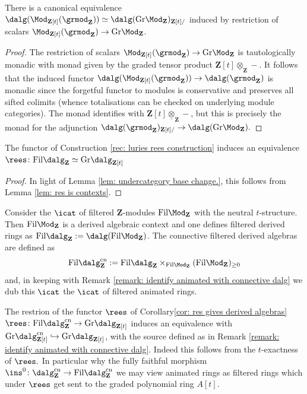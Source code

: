 \documentclass[10pt,reqno]{amsart}
\numberwithin{equation}{section}
\newcommand{\ZZ}{\mathbf{Z}}
\newcommand{\Gr}{\mathrm{Gr}}
\newcommand{\fil}{\mathrm{Fil}}
\newcommand{\into}{\hookrightarrow}
\newcommand{\cn}{\mathrm{cn}}
\begin{document}
    
\begin{lemma}\label{lem: undercategory base change.} 
    There is a canonical equivalence $\dalg(\Mod_{\ZZ[t]}(\grmod_\ZZ))\simeq \dalg(\Gr\Mod_\ZZ)_{\ZZ[t]/}$ induced by restriction of scalars $\Mod_{\ZZ[t]}(\grmod_\ZZ)\to \Gr\Mod_\ZZ$.
\end{lemma}
\begin{proof}

The restriction of scalars $\Mod_{\ZZ[t]}(\grmod_\ZZ)\to \Gr\Mod_\ZZ$ is tautologically monadic with monad given by the graded tensor product $\ZZ[t]\underline{\otimes}_{\ZZ}-$. 
It follows that the induced functor $\dalg(\Mod_{\ZZ[t]}(\grmod_\ZZ))\to \dalg(\grmod_{\ZZ})$ is monadic since the forgetful functor to modules is conservative and preserves all sifted colimits (whence totalisations can be checked on underlying module categories). The monad identifies with $\ZZ[t]\underline{\otimes}_{\ZZ}-$, but this is precisely the monad for the adjunction $\dalg(\grmod_{\ZZ})_{\ZZ[t]/}\to \dalg(\Gr\Mod_\ZZ).$ 
\end{proof}


\begin{corollary}\label{cor: res gives derived algebras}
    The functor of Construction \ref{rec: luries rees construction} induces an equivalence $\rees\colon \fil\dalg_\ZZ\simeq \Gr\dalg_{\ZZ[t]}$
\end{corollary}
\begin{proof}
    In light of Lemma \ref{lem: undercategory base change.}, this follows from Lemma \ref{lem: res is contexts}.
\end{proof}




\begin{recollection}\label{rec: filtered derived algebras}
    Consider the $\icat$ of filtered $\ZZ$-modules $\fil\Mod_\ZZ$ with the neutral $t$-structure. Then $\fil\Mod_\ZZ$ is a derived algebraic context and one defines filtered derived rings as $\fil\dalg_{\ZZ}:=\dalg(\fil\Mod_\ZZ)$. The connective filtered derived algebras are defined as $$\fil\dalg_\ZZ^\cn:=\fil\dalg_{\ZZ}\times_{\fil\Mod_\ZZ}(\fil\Mod_{\ZZ})_{\geq 0}$$ and, in keeping with Remark \ref{remark: identify animated with connective dalg} we dub this $\icat$ the $\icat$ of filtered animated rings. 
\end{recollection}


\begin{remark}\label{remark: rees connective sent to connective}
    The restrion of the functor $\rees$ of Corollary\ref{cor: res gives derived algebras} $\rees\colon \fil\dalg_\ZZ^\cn\to \Gr\dalg_{\ZZ[t]}$ induces an equivalence with $\Gr\dalg_{\ZZ[t]}^\cn\into \Gr\dalg_{\ZZ[t]}$, with the source defined as in Remark \ref{remark: identify animated with connective dalg}. Indeed this follows from the $t$-exactness of $\rees.$ In particular why the fully faithful morphism $\ins^0\colon \dalg^\cn_\ZZ\to \fil\dalg^\cn_{\ZZ}$ we may view animated rings as filtered rings which under $\rees$ get sent to the graded polynomial ring $A[t].$
\end{remark}
\end{document}
